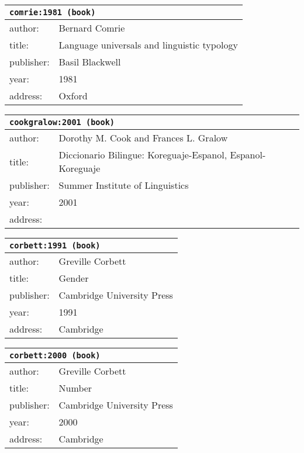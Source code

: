 \documentclass{article}
\begin{document}
\bigskip

\begin{tabular}{p{}p{}}
\multicolumn{2}{l}{\texttt{comrie:1981 (book)}}\\
\hline
author: & Bernard Comrie\\
title: & Language universals and linguistic typology\\
publisher: & Basil Blackwell\\
year: & 1981\\
address: & Oxford\\
\end{tabular}

\bigskip

\begin{tabular}{p{}p{}}
\multicolumn{2}{l}{\texttt{cookgralow:2001 (book)}}\\
\hline
author: & Dorothy M. Cook and Frances L. Gralow\\
title: & Diccionario Bilingue: Koreguaje-Espanol, Espanol-Koreguaje\\
publisher: & Summer Institute of Linguistics\\
year: & 2001\\
address: & \\
\end{tabular}

\bigskip

\begin{tabular}{p{}p{}}
\multicolumn{2}{l}{\texttt{corbett:1991 (book)}}\\
\hline
author: & Greville Corbett\\
title: & Gender\\
publisher: & Cambridge University Press\\
year: & 1991\\
address: & Cambridge\\
\end{tabular}

\bigskip

\begin{tabular}{p{}p{}}
\multicolumn{2}{l}{\texttt{corbett:2000 (book)}}\\
\hline
author: & Greville Corbett\\
title: & Number\\
publisher: & Cambridge University Press\\
year: & 2000\\
address: & Cambridge\\
\end{tabular}
\end{document}
